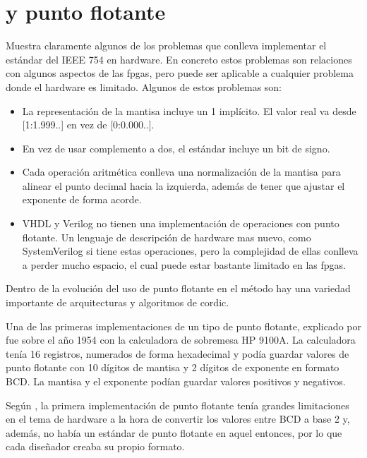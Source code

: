\section{ y punto flotante}

\cite{parker_abstract_2011} Muestra claramente algunos de los problemas que conlleva implementar el estándar del IEEE 754 en hardware. En concreto estos problemas son relaciones con algunos aspectos de las \gls{fpga}s, pero puede ser aplicable a cualquier problema donde el hardware es limitado. Algunos de estos problemas son:

\begin{itemize}
	\item La representación de la mantisa incluye un 1 implícito. El valor real va desde [1:1.999..] en vez de [0:0.000..]. 
	\item En vez de usar complemento a dos, el estándar incluye un bit de signo.
	\item Cada operación aritmética conlleva una normalización de la mantisa para alinear el punto decimal hacia la izquierda, además de tener que ajustar el exponente de forma acorde.
	\item VHDL y Verilog no tienen una implementación de operaciones con punto flotante. Un lenguaje de descripción de hardware mas nuevo, como SystemVerilog si tiene estas operaciones, pero la complejidad de ellas conlleva a perder mucho espacio, el cual puede estar bastante limitado en las \gls{fpga}s.
\end{itemize}

Dentro de la evolución del uso de punto flotante en el método hay una variedad importante de arquitecturas y algoritmos de \gls{cordic}.

Una de las primeras implementaciones de un tipo de punto flotante, explicado por \cite{leibson_9100_2005} fue sobre el año 1954 con la calculadora de sobremesa HP 9100A. La calculadora tenía 16 registros, numerados de forma hexadecimal y podía guardar valores de punto flotante con 10 dígitos de mantisa y 2 dígitos de exponente en formato BCD. La mantisa y el exponente podían guardar valores positivos y negativos.

Según \cite{walther_unified_1971}, la primera implementación de punto flotante tenía grandes limitaciones en el tema de hardware a la hora de convertir los valores entre BCD a base 2 y, además, no había un estándar de punto flotante en aquel entonces, por lo que cada diseñador creaba su propio formato.

